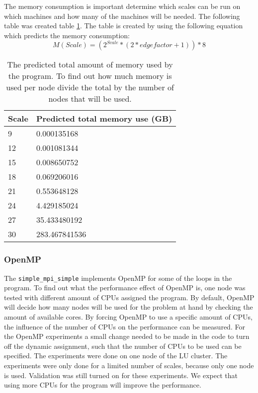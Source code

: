 The memory consumption is important determine which scales can be run on which machines and how many of the machines will be needed. The following table was created table \ref{tab:calculation memory consumption}. The table is created by using the following equation which predicts the memory consumption:
\begin{equation}
M(Scale) = (2^{Scale} *(2*edgefactor + 1)) * 8
\end{equation}
\begin{table} [!h]
	\begin{center}
		\begin{tabular}{|l|l|}
			\hline
			Scale & Predicted total memory use (GB) \\ \hline
			9 &  0.000135168 \\ \hline
			12 & 0.001081344 \\ \hline
			15 & 0.008650752 \\ \hline
			18 & 0.069206016 \\ \hline
			21 & 0.553648128 \\ \hline
			24 & 4.429185024 \\ \hline
			27 & 35.433480192 \\ \hline
			30 & 283.467841536 \\ \hline
		\end{tabular}
	\end{center}
	
	\caption{The predicted total amount of memory used by the program. To find out how much memory is used per node divide the total by the number of nodes that will be used.}
	\label{tab:calculation memory consumption}
\end{table}


\subsubsection{OpenMP}
The \texttt{simple\_mpi\_simple} implements OpenMP for some of the loops in the program. To find out what the performance effect of OpenMP is, one node was tested with different amount of CPUs assigned the program. By default, OpenMP will decide how many nodes will be used for the problem at hand by checking the amount of available cores. By forcing OpenMP to use a specific amount of CPUs, the influence of the number of CPUs on the performance can be measured. For the OpenMP experiments a small change needed to be made in the code to turn off the dynamic assignment, such that the number of CPUs to be used can be specified. The experiments were done on one node of the LU cluster. The experiments were only done for a limited number of scales, because only one node is used. Validation was still turned on for these experiments. We expect that using more CPUs for the program will improve the performance.

